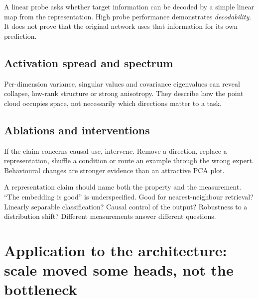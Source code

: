 A linear probe asks whether target information can be decoded by a simple linear map from the representation. High probe performance demonstrates \emph{decodability}. It does not prove that the original network uses that information for its own prediction.

\subsection{Activation spread and spectrum}

Per-dimension variance, singular values and covariance eigenvalues can reveal collapse, low-rank structure or strong anisotropy. They describe how the point cloud occupies space, not necessarily which directions matter to a task.

\subsection{Ablations and interventions}

If the claim concerns causal use, intervene. Remove a direction, replace a representation, shuffle a condition or route an example through the wrong expert. Behavioural changes are stronger evidence than an attractive PCA plot.

\begin{keyidea}
A representation claim should name both the property and the measurement. ``The embedding is good'' is underspecified. Good for nearest-neighbour retrieval? Linearly separable classification? Causal control of the output? Robustness to a distribution shift? Different measurements answer different questions.
\end{keyidea}

\section{Application to the architecture: scale moved some heads, not the bottleneck}

